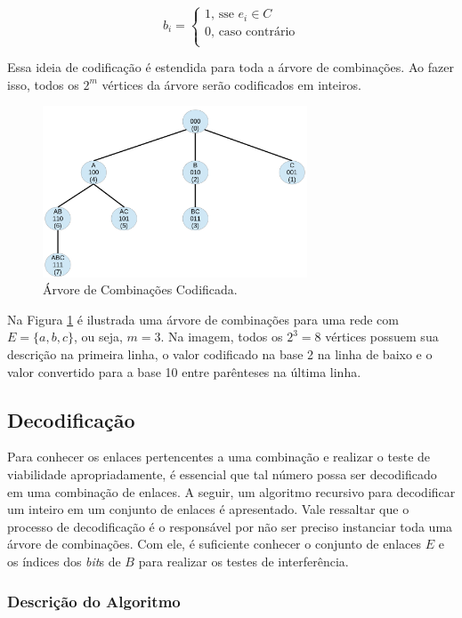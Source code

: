 \[ b_i =
\begin{cases}
	1	\text{, sse } e_i \in C\\
	0	\text{, caso contrário}\\
  \end{cases}
\]

Essa ideia de codificação é estendida para toda a árvore de combinações. Ao fazer isso, todos os $2^m$ vértices da árvore serão codificados em inteiros.

\begin{figure}[htb]
\centering
\includegraphics[width=0.7\textwidth]{figs/codificacao}
\caption[Árvore de Combinações Codificada.]
{Árvore de Combinações Codificada.}
\label{fig:codificacao}
\end{figure}

Na Figura \ref{fig:codificacao} é ilustrada uma árvore de combinações para uma rede com $E=\{a,b,c\}$, ou seja, $m=3$. Na imagem, todos os $2^3 = 8$ vértices possuem sua descrição na primeira linha, o valor codificado na base 2 na linha de baixo e o valor convertido para a base 10 entre parênteses na última linha.

\subsection{Decodificação}

Para conhecer os enlaces pertencentes a uma combinação e realizar o teste de viabilidade apropriadamente, é essencial que tal número possa ser decodificado em uma combinação de enlaces. A seguir, um algoritmo recursivo para decodificar um inteiro em um conjunto de enlaces é apresentado. Vale ressaltar que o processo de decodificação é o responsável por não ser preciso instanciar toda uma árvore de combinações. Com ele, é suficiente conhecer o conjunto de enlaces $E$ e os índices dos {\it bit}s de $B$ para realizar os testes de interferência.

\subsubsection{Descrição do Algoritmo}

